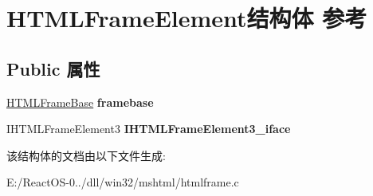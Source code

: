 \hypertarget{struct_h_t_m_l_frame_element}{}\section{H\+T\+M\+L\+Frame\+Element结构体 参考}
\label{struct_h_t_m_l_frame_element}
\subsection*{Public 属性}
\begin{DoxyCompactItemize}
\item 
\mbox{\label{struct_h_t_m_l_frame_element_a642e8b68fd50b4b64cafb5c47f198507}} 
\hyperlink{struct_h_t_m_l_frame_base}{H\+T\+M\+L\+Frame\+Base} {\bfseries framebase}
\item 
\mbox{\label{struct_h_t_m_l_frame_element_afa49cb8efe91957b824521ecc36a0adc}} 
I\+H\+T\+M\+L\+Frame\+Element3 {\bfseries I\+H\+T\+M\+L\+Frame\+Element3\+\_\+iface}
\end{DoxyCompactItemize}


该结构体的文档由以下文件生成\+:\begin{DoxyCompactItemize}
\item 
E\+:/\+React\+O\+S-\/0../dll/win32/mshtml/htmlframe.\+c\end{DoxyCompactItemize}
